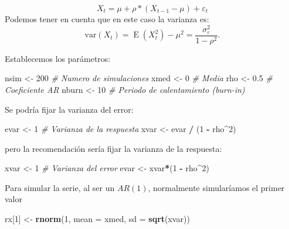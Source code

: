 \documentclass[
]{book}
\newenvironment{Shaded}{\begin{snugshade}}{\end{snugshade}}
\newcommand{\CommentTok}[1]{\textcolor[rgb]{0.56,0.35,0.01}{\textit{#1}}}
\newcommand{\DataTypeTok}[1]{\textcolor[rgb]{0.13,0.29,0.53}{#1}}
\newcommand{\DecValTok}[1]{\textcolor[rgb]{0.00,0.00,0.81}{#1}}
\newcommand{\FloatTok}[1]{\textcolor[rgb]{0.00,0.00,0.81}{#1}}
\newcommand{\KeywordTok}[1]{\textcolor[rgb]{0.13,0.29,0.53}{\textbf{#1}}}
\newcommand{\NormalTok}[1]{#1}
\newcommand{\OperatorTok}[1]{\textcolor[rgb]{0.81,0.36,0.00}{\textbf{#1}}}
\newcommand{\StringTok}[1]{\textcolor[rgb]{0.31,0.60,0.02}{#1}}
\theoremstyle{break}
\theoremstyle{definition}
\theoremstyle{definition}
\theoremstyle{definition}
\theoremstyle{remark}
\begin{document}
\[X_t = \mu + \rho * (X_{t-1} - \mu) + \varepsilon_t\]
Podemos tener en cuenta que en este caso la varianza es:
\[\textrm{var}(X_t)=\operatorname{E}(X_t^2)-\mu^2=\frac{\sigma_\varepsilon^2}{1-\rho^2}.\]

Establecemos los parámetros:

\begin{Shaded}
\begin{Highlighting}[]
\NormalTok{nsim <-}\StringTok{ }\DecValTok{200}   \CommentTok{# Numero de simulaciones}
\NormalTok{xmed <-}\StringTok{ }\DecValTok{0}     \CommentTok{# Media}
\NormalTok{rho <-}\StringTok{ }\FloatTok{0.5}    \CommentTok{# Coeficiente AR}
\NormalTok{nburn <-}\StringTok{ }\DecValTok{10}   \CommentTok{# Periodo de calentamiento (burn-in)}
\end{Highlighting}
\end{Shaded}

Se podría fijar la varianza del error:

\begin{Shaded}
\begin{Highlighting}[]
\NormalTok{evar <-}\StringTok{ }\DecValTok{1}
\CommentTok{# Varianza de la respuesta}
\NormalTok{xvar <-}\StringTok{ }\NormalTok{evar }\OperatorTok{/}\StringTok{ }\NormalTok{(}\DecValTok{1} \OperatorTok{-}\StringTok{ }\NormalTok{rho}\OperatorTok{^}\DecValTok{2}\NormalTok{)}
\end{Highlighting}
\end{Shaded}

pero la recomendación sería fijar la varianza de la respuesta:

\begin{Shaded}
\begin{Highlighting}[]
\NormalTok{xvar <-}\StringTok{ }\DecValTok{1}     
\CommentTok{# Varianza del error}
\NormalTok{evar <-}\StringTok{ }\NormalTok{xvar}\OperatorTok{*}\NormalTok{(}\DecValTok{1} \OperatorTok{-}\StringTok{ }\NormalTok{rho}\OperatorTok{^}\DecValTok{2}\NormalTok{)}
\end{Highlighting}
\end{Shaded}

Para simular la serie, al ser un \(AR(1)\), normalmente simularíamos el primer valor

\begin{Shaded}
\begin{Highlighting}[]
\NormalTok{rx[}\DecValTok{1}\NormalTok{] <-}\StringTok{ }\KeywordTok{rnorm}\NormalTok{(}\DecValTok{1}\NormalTok{, }\DataTypeTok{mean =}\NormalTok{ xmed, }\DataTypeTok{sd =} \KeywordTok{sqrt}\NormalTok{(xvar))}
\end{Highlighting}
\end{Shaded}
\end{document}
